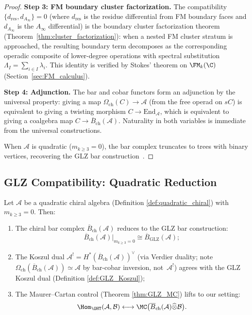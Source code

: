 \begin{proof}
\textbf{Step 3: FM boundary cluster factorization.}
The compatibility $\{d_{\mathrm{res}}, d_{A_\infty}\} = 0$ (where $d_{\mathrm{res}}$ is the residue differential from FM boundary faces and $d_{A_\infty}$ is the $A_\infty$ differential) is the boundary cluster factorization theorem (Theorem~\ref{thm:cluster_factorization}): when a nested FM cluster stratum is approached, the resulting boundary term decomposes as the corresponding operadic composite of lower-degree operations with spectral substitution $\Lambda_I = \sum_{i \in I} \lambda_i$. This identity is verified by Stokes' theorem on $\FM_k(\C)$ (Section~\ref{sec:FM_calculus}).

\textbf{Step 4: Adjunction.}
The bar and cobar functors form an adjunction by the universal property: giving a map $\Omega_{\mathrm{ch}}(C) \to \mathcal{A}$ (from the free operad on $sC$) is equivalent to giving a twisting morphism $C \to \mathrm{End}_{\mathcal{A}}$, which is equivalent to giving a coalgebra map $C \to \overline{B}_{\mathrm{ch}}(\mathcal{A})$. Naturality in both variables is immediate from the universal constructions.

When $\mathcal{A}$ is quadratic ($m_{k \geq 3} = 0$), the bar complex truncates to trees with binary vertices, recovering the GLZ bar construction~\cite{GLZ22}.
\end{proof}

\subsection{GLZ Compatibility: Quadratic Reduction}

\begin{theorem}
\label{thm:GLZ_compatibility}
Let $\mathcal{A}$ be a quadratic chiral algebra (Definition \ref{def:quadratic_chiral}) with $m_{k \geq 3} = 0$. Then:
\begin{enumerate}[label=(\roman*)]
\item The chiral bar complex $\overline{B}_{\text{ch}}(\mathcal{A})$ reduces to the GLZ bar construction:
\begin{equation}
\overline{B}_{\text{ch}}(\mathcal{A})|_{m_{k \geq 3} = 0} \cong \overline{B}_{\text{GLZ}}(\mathcal{A});
\end{equation}

\item The Koszul dual $\mathcal{A}^! = H^*(\overline{B}_{\text{ch}}(\mathcal{A}))^\vee$
\textup{(}via Verdier duality; note
$\Omega_{\text{ch}}(\overline{B}_{\text{ch}}(\mathcal{A}))
\simeq \mathcal{A}$ by bar-cobar inversion, not~$\mathcal{A}^!$\textup{)}
agrees with the GLZ Koszul dual (Definition \ref{def:GLZ_Koszul});

\item The Maurer--Cartan control (Theorem \ref{thm:GLZ_MC}) lifts to our setting:
\begin{equation}
\Hom_{\OHT}(\mathcal{A}, \mathcal{B}) \longleftrightarrow \MC\big(\overline{B}_{\text{ch}}(\mathcal{A}) \widehat{\otimes} \mathcal{B}\big).
\end{equation}
\end{enumerate}
\end{theorem}

